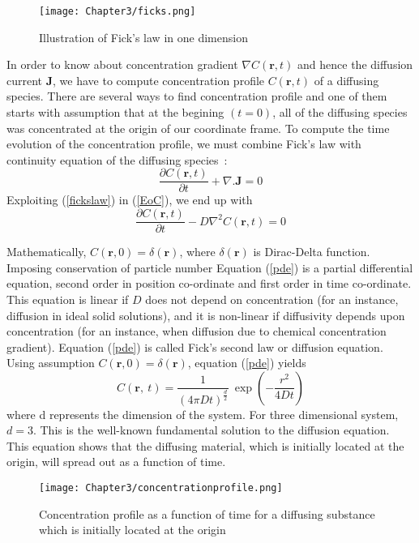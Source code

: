      \begin{figure}[h!]
      \centering
      \texttt{[image: Chapter3/ficks.png]}
      \caption {Illustration of Fick’s law in one dimension ~ \citep{mehrer2007} } 
      \label{diffusion_ficks} 
      \end{figure}
       In order to know about concentration gradient $\nabla C(\textbf{r},t)$ and hence the diffusion current $\textbf{J}$, we have to compute concentration profile $C(\textbf{r}, t)$ of a diffusing species.  There are several ways to find concentration profile and one of them starts with assumption that at the begining $(t=0)$, all of the diffusing species was concentrated at the origin of our coordinate frame. To compute the time evolution of the concentration profile, we must combine Fick's law with continuity equation of the diffusing species~\citep{mehrer2007}:  
    \begin{equation}
    \label{EoC}
    \frac{\partial C(\mathbf{r},t)}{\partial t} +   \nabla . \mathbf{J} = 0
    \end{equation}
    Exploiting (\ref{fickslaw}) in (\ref{EoC}), we end up with 
    \begin{equation}
    \label{pde}
    \frac{\partial C(\textbf{r},t)}{\partial t} -  D \nabla^2C(\textbf{r},t) = 0
    \end{equation}
    
    Mathematically, $C(\textbf{r},0) = \delta(\textbf{r})$, where $\delta(\textbf{r})$ is Dirac-Delta function.\\
        \noindent Imposing conservation of particle number
    Equation (\ref{pde}) is a partial differential equation, second order in position co-ordinate and first order in time co-ordinate. This equation is linear if $D$ does not depend on concentration (for an instance, diffusion in ideal solid solutions), and it is non-linear if diffusivity depends upon concentration (for an instance, when diffusion due to chemical concentration gradient). Equation (\ref{pde}) is called Fick's second law or diffusion equation.\\
    \noindent Using assumption $C(\textbf{r},0) = \delta(\textbf{r})$, equation (\ref{pde}) yields
    \begin{equation}
    \label{concentration}
    C(\textbf{r},~t) = \frac{1}{(4\pi D t)^{\frac{d}{2}}}~ \exp\left( -\frac{r^2}{4Dt}\right)
    \end{equation}
    where d represents the dimension of the system. For three dimensional system, $d=3$. This is the well-known fundamental solution to the diffusion equation. This equation shows that the diffusing material, which is initially located at the origin, will spread out as a function of time.
    \begin{figure}[h!]
    \centering
    \texttt{[image: Chapter3/concentrationprofile.png]}
    \caption{Concentration profile as a function of time for a diffusing substance which is initially located at the origin~ \citep{mcquarrie2000} }
    \label{fig:concprofile}
    \end{figure}
    
